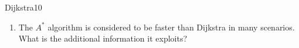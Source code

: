 \documentclass[twoside,a4paper]{article}
\begin{document}
\begin{task}{Dijkstra}{10}{}
\begin{enumerate}
{    \vspace{1cm}}
    \item{The $A^*$ algorithm is considered to be faster than Dijkstra in many scenarios. What is the additional information it exploits?\vspace{3cm}}
    \end{enumerate}
  

  \end{task}
\end{document}
